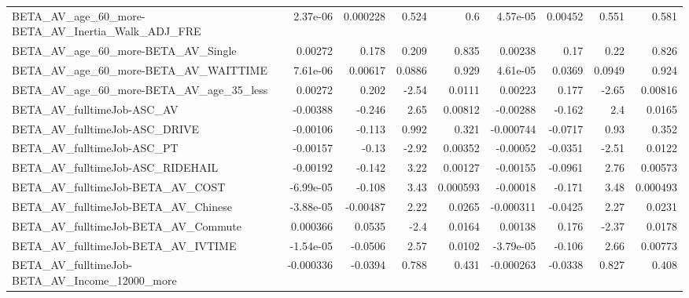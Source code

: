 \begin{tabular}{lrrrrrrrr}
BETA\_AV\_age\_60\_more-BETA\_AV\_Inertia\_Walk\_ADJ\_FRE   &    2.37e-06 &     0.000228 &    0.524 &      0.6 &   4.57e-05 &     0.00452 &        0.551 &         0.581 \\
BETA\_AV\_age\_60\_more-BETA\_AV\_Single                 &     0.00272 &        0.178 &    0.209 &    0.835 &    0.00238 &        0.17 &         0.22 &         0.826 \\
BETA\_AV\_age\_60\_more-BETA\_AV\_WAITTIME               &    7.61e-06 &      0.00617 &   0.0886 &    0.929 &   4.61e-05 &      0.0369 &       0.0949 &         0.924 \\
BETA\_AV\_age\_60\_more-BETA\_AV\_age\_35\_less            &     0.00272 &        0.202 &    -2.54 &   0.0111 &    0.00223 &       0.177 &        -2.65 &       0.00816 \\
BETA\_AV\_fulltimeJob-ASC\_AV                         &    -0.00388 &       -0.246 &     2.65 &  0.00812 &   -0.00288 &      -0.162 &          2.4 &        0.0165 \\
BETA\_AV\_fulltimeJob-ASC\_DRIVE                      &    -0.00106 &       -0.113 &    0.992 &    0.321 &  -0.000744 &     -0.0717 &         0.93 &         0.352 \\
BETA\_AV\_fulltimeJob-ASC\_PT                         &    -0.00157 &        -0.13 &    -2.92 &  0.00352 &   -0.00052 &     -0.0351 &        -2.51 &        0.0122 \\
BETA\_AV\_fulltimeJob-ASC\_RIDEHAIL                   &    -0.00192 &       -0.142 &     3.22 &  0.00127 &   -0.00155 &     -0.0961 &         2.76 &       0.00573 \\
BETA\_AV\_fulltimeJob-BETA\_AV\_COST                   &   -6.99e-05 &       -0.108 &     3.43 & 0.000593 &   -0.00018 &      -0.171 &         3.48 &      0.000493 \\
BETA\_AV\_fulltimeJob-BETA\_AV\_Chinese                &   -3.88e-05 &     -0.00487 &     2.22 &   0.0265 &  -0.000311 &     -0.0425 &         2.27 &        0.0231 \\
BETA\_AV\_fulltimeJob-BETA\_AV\_Commute                &    0.000366 &       0.0535 &     -2.4 &   0.0164 &    0.00138 &       0.176 &        -2.37 &        0.0178 \\
BETA\_AV\_fulltimeJob-BETA\_AV\_IVTIME                 &   -1.54e-05 &      -0.0506 &     2.57 &   0.0102 &  -3.79e-05 &      -0.106 &         2.66 &       0.00773 \\
BETA\_AV\_fulltimeJob-BETA\_AV\_Income\_12000\_more      &   -0.000336 &      -0.0394 &    0.788 &    0.431 &  -0.000263 &     -0.0338 &        0.827 &         0.408 \\

\end{tabular}
